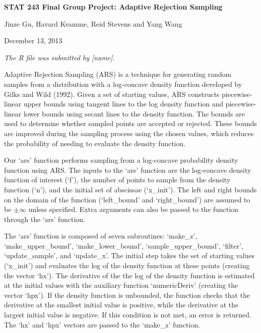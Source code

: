 \documentclass{article}
\begin{document}
\begin{center}
\LARGE{
\textbf{STAT 243 Final Group Project: Adaptive Rejection Sampling}
}

\vspace{10 mm}

\large{
Jinze Gu, Havard Kvamme, Reid Stevens and Yang Wang

December 13, 2013

\vspace{10 mm}

\emph{The R file was submitted by [name].}

}

\end{center}


\newpage


Adaptive Rejection Sampling (ARS) is a technique for generating random samples from a distribution with a log-concave density function developed by Gilks and Wild (1992).  Given a set of starting values, ARS constructs piecewise-linear upper bounds using tangent lines to the log density function and piecewise-linear lower bounds using secant lines to the density function.  The bounds are used to determine whether sampled points are accepted or rejected.  These bounds are improved during the sampling process using the chosen values, which reduces the probability of needing to evaluate the density function.

Our `ars' function performs sampling from a log-concave probability density function using ARS.  The inputs to the `ars' function are the log-concave density function of interest (`f'), the number of points to sample from the density function (`n'), and the initial set of abscissae (`x\_init').  The left and right bounds on the domain of the function (`left\_bound' and `right\_bound') are assumed to be $\pm\infty$ unless specified.  Extra arguments can also be passed to the function through the `ars' function.

The `ars' function is composed of seven subroutines: `make\_z', `make\_upper\_bound', `make\_lower\_bound', `sample\_upper\_bound', `filter', `update\_sample', and `update\_x'.  The initial step takes the set of starting values (`x\_init') and evaluates the log of the density function at these points (creating the vector `hx'). The derivative of the the log of the density function is estimated at the initial values with the auxiliary function `numericDeriv' (creating the vector `hpx'). If the density function is unbounded, the function checks that the derivative at the smallest initial value is positive, while the derivative at the largest initial value is negative.  If this condition is not met, an error is returned.  The `hx' and `hpx' vectors are passed to the `make\_z' function.
\end{document}
